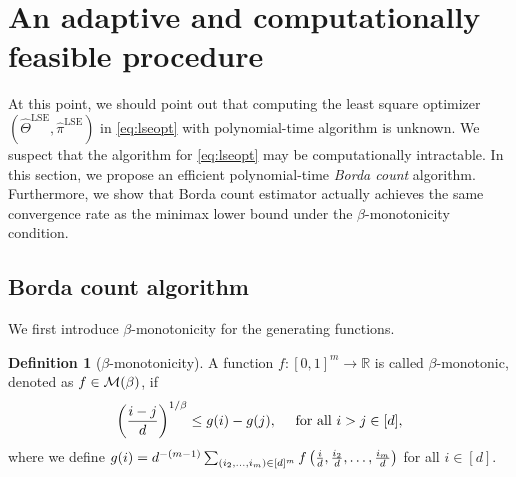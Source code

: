 \documentclass{article}
\theoremstyle{definition}
\newtheorem{defn}{Definition}
\begin{document}


\vspace{-.2cm}
\section{An adaptive and computationally feasible procedure}\label{sec:borda}
\vspace{-.2cm}
At this point, we should point out that computing the least square optimizer $(\hat\Theta^{\text{LSE}},\hat\pi^{\text{LSE}})$ in \eqref{eq:lseopt} with polynomial-time algorithm is unknown. We suspect that the algorithm for \eqref{eq:lseopt} may be computationally intractable. In this section, we propose an efficient polynomial-time \emph{Borda count} algorithm. Furthermore, we show that Borda count estimator actually achieves the same convergence rate as the minimax lower bound under the $\beta$-monotonicity condition. 
\vspace{-.2cm}
\subsection{Borda count algorithm}
\vspace{-.2cm}
We first introduce $\beta$-monotonicity for the generating functions.  
\begin{defn}[$\beta$-monotonicity]\label{eq:defn}
A function $f\colon[0,1]^m \rightarrow \mathbb{R}$ is called $\beta$-monotonic, denoted as $f\in\mathcal{M}(\beta)$, if 
\begin{align}\label{eq:monotonic}
    \left({i-j\over d}\right)^{1/\beta}\leq g(i)-g(j),\quad \text{ for all } i>j\in[d],
\end{align}
where we define $g(i) = d^{-(m-1)}\sum_{(i_2,\ldots,i_m)\in[d]^m} f\left({i\over d},{i_2\over d},\ldots,{i_m\over d}\right)$ for all $i \in[d].$
\end{defn}
\end{document}
